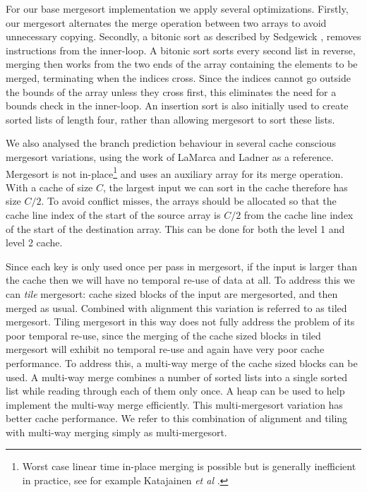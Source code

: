 \documentclass[acmtocl]{acmtrans2m}
\begin{document}
For our base
mergesort implementation we apply several optimizations.
Firstly, our mergesort alternates the merge
operation between two arrays to avoid unnecessary copying.
Secondly, a bitonic sort as described by Sedgewick \citeyear{Sedgewick02},
removes instructions from the inner-loop. A bitonic sort
sorts every second list in reverse, merging then works
from the two ends of the array containing the elements to
be merged, terminating when the indices cross. Since the indices
cannot go outside the bounds of the array unless they cross first, 
this eliminates the need for a bounds check in the inner-loop.
An insertion sort is also initially used to create
sorted lists of length four, rather than allowing mergesort to
sort these lists.

We also analysed the branch prediction behaviour in several
cache conscious mergesort variations, using the work of LaMarca and Ladner \citeyear{LaMarca97} as a reference.
Mergesort is not in-place\footnote{Worst case linear time in-place merging is possible but is generally inefficient in practice, see for example Katajainen 
\textit{et al} \citeyear{Katajainen+96}.}
and uses an auxiliary array 
for
its merge operation. With a cache of size $C$, the largest input we can sort in the cache therefore has size $C/2$. To avoid conflict misses, the
arrays should be allocated so that the cache line index of the start of the source array is $C/2$ from the cache line index of the start of the destination array. 
This can
be done for both the level 1 and level 2 cache. 

Since each key is only used once per pass
in mergesort, if the input is larger than the cache then we will have no temporal re-use of data at all. To address this we can \textit{tile}
mergesort: cache sized blocks of the input are mergesorted, and then merged as usual. Combined with alignment this variation is referred to as
tiled mergesort. Tiling mergesort in this way does not fully address the problem of its poor temporal re-use, since the merging of the cache sized blocks in tiled 
mergesort will exhibit no temporal re-use and again have very poor
cache performance. To address this, a multi-way merge of the cache sized blocks can be used. A multi-way merge combines a number of sorted lists into a 
single sorted
list while reading through each of them only once. A heap can be used to help implement the multi-way merge efficiently. 
This multi-mergesort variation has better cache performance. We refer to this combination of alignment and tiling with multi-way merging
simply as multi-mergesort.
\end{document}
